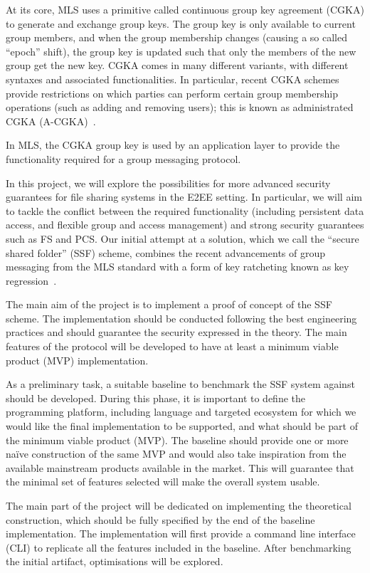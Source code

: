 \documentclass[E]{BAMASA}
\begin{document}
At its core, MLS uses a primitive called continuous group key agreement (CGKA) to generate and exchange group keys.
The group key is only available to current group members, and when the group membership changes (causing a so called ``epoch'' shift), the group key is updated such that only the members of the new group get the new key.
CGKA comes in many different variants, with different syntaxes and associated functionalities.
In particular, recent CGKA schemes provide restrictions on which parties can perform certain group membership operations (such as adding and removing users);
this is known as administrated CGKA (A-CGKA)~\cite{USENIX:BalColVau23}.

In MLS, the CGKA group key is used by an application layer to provide the functionality required for a group messaging protocol.


In this project, we will explore the possibilities for more advanced security guarantees for file sharing systems in the E2EE setting.
In particular, we will aim to tackle the conflict between the required functionality (including persistent data access, and flexible group and access management) and strong security guarantees such as FS and PCS.
Our initial attempt at a solution, which we call the ``secure shared folder'' (SSF) scheme, combines the recent advancements of group messaging from the MLS standard with a form of key ratcheting known as key regression~\cite{NDSS:FuKamKoh06}.




\desc
The main aim of the project is to implement a proof of concept of the SSF scheme.
The implementation should be conducted following the best engineering practices 
and should guarantee the security expressed in the theory.
The main features of the protocol will be developed to have at least a minimum viable 
product (MVP) implementation.

As a preliminary task, a suitable baseline to benchmark the SSF system against should be developed.
During this phase, it is important to define the programming platform, including language 
and targeted ecosystem for which we would like the final implementation to be supported, 
and what should be part of the minimum viable product (MVP).
The baseline should provide one or more na\"ive construction of the same MVP and would 
also take inspiration from the available mainstream products available in the market.
This will guarantee that the minimal set of features selected will make the overall system usable.

The main part of the project will be dedicated on implementing the theoretical construction, 
which should be fully specified by the end of the baseline implementation. 
The implementation will first provide a command line interface (CLI) to replicate 
all the features included in the baseline.
After benchmarking the initial artifact, optimisations will be explored. 
\end{document}
